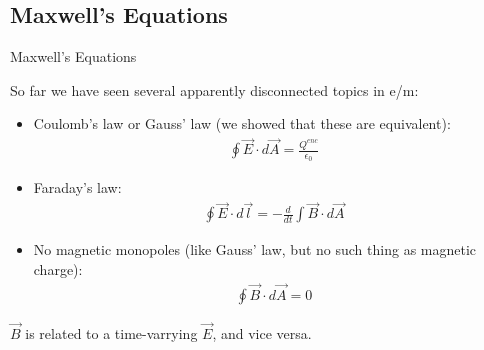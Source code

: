 \documentclass[aspectratio=169,
hyperref={colorlinks,urlcolor=blue}
]{beamer}
\begin{document}




\subsection{Maxwell's Equations}
\label{subsec:maxwellsequations}
\begin{bulletframe}{Maxwell's Equations}
\item So far we have seen several apparently disconnected topics in e/m:
\begin{itemize}
\item Coulomb’s law or Gauss’ law (we showed that these are equivalent):
\begin{align*}
\oint \vec E \cdot d\vec A = \frac{Q^{enc}}{\epsilon_0}
\end{align*}
\item Faraday’s law:
\begin{align*}
\oint \vec E \cdot d\vec l = -\frac{d}{dt}\int \vec B\cdot d\vec A
\end{align*}
\item No magnetic monopoles (like Gauss’ law, but no such thing as magnetic charge):
\begin{align*}
\oint \vec B \cdot d\vec A = 0
\end{align*}
\end{itemize}
\item<2->[$\rightarrow$]\color{qred} $\vec B$ is related to a time-varrying $\vec E$, and vice versa.
\end{bulletframe}
\end{document}
